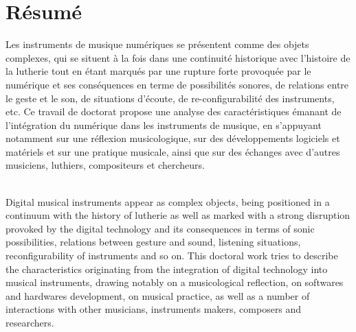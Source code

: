 %
\chapter*{Résumé}
\label{sec:abstract}
\vspace*{-10mm}

\noindent Les instruments de musique numériques se présentent comme des objets complexes, qui se situent à la fois dans une continuité historique avec l'histoire de la lutherie tout en étant marqués par une rupture forte provoquée par le numérique et ses conséquences en terme de possibilités sonores, de relations entre le geste et le son, de situations d'écoute, de re-configurabilité des instruments, etc. Ce travail de doctorat propose une analyse des caractéristiques émanant de l'intégration du numérique dans les instruments de musique, en s'appuyant notamment sur une réflexion musicologique, sur des développements logiciels et matériels et sur une pratique musicale, ainsi que sur des échanges avec d'autres musiciens, luthiers, compositeurs et chercheurs.

\vspace*{20mm}

\label{sec:abstract-diff} \\

\noindent Digital musical instruments appear as complex objects, being positioned in a continuum with the history of lutherie as well as marked with a strong disruption provoked by the digital technology and its consequences in terms of sonic possibilities, relations between gesture and sound, listening situations, reconfigurability of instruments and so on. This doctoral work tries to describe the characteristics originating from the integration of digital technology into musical instruments, drawing notably on a musicological reflection, on softwares and hardwares development, on musical practice, as well as a number of interactions with other musicians, instruments makers, composers and researchers.
